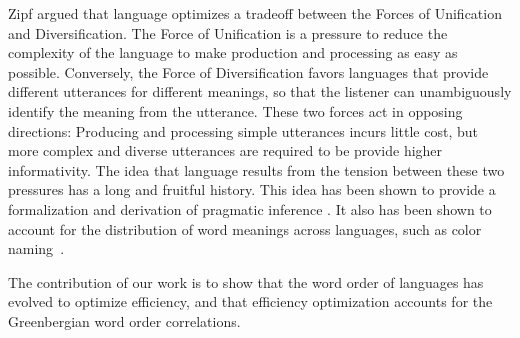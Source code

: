 \documentclass[9pt,twocolumn,twoside,lineno]{pnas-new}
\newcommand{\key}[1]{\textbf{#1}}
\begin{document}
Zipf \cite{zipf1949human} argued that language optimizes a tradeoff between the Forces of Unification and Diversification.
The Force of Unification is a pressure to reduce the complexity of the language to make production and processing as easy as possible.
Conversely, the Force of Diversification favors languages that provide different utterances for different meanings, so that the listener can unambiguously identify the meaning from the utterance.
These two forces act in opposing directions:
Producing and processing simple utterances incurs little cost, but more complex and diverse utterances are required to be provide higher informativity.
The idea that language results from the tension between these two pressures has a long and fruitful history.
%
%
%
This idea has been shown to provide a formalization and derivation of pragmatic inference \cite{horn-toward-1984, frank2012predicting}.
It also has been shown to account for the distribution of word meanings across languages, such as color naming~\cite{zaslavsky2018efficient}.


%

%
%




The contribution of our work is to show  that the word order of languages has evolved to optimize efficiency, and that efficiency optimization accounts for the Greenbergian word order correlations.
\end{document}
